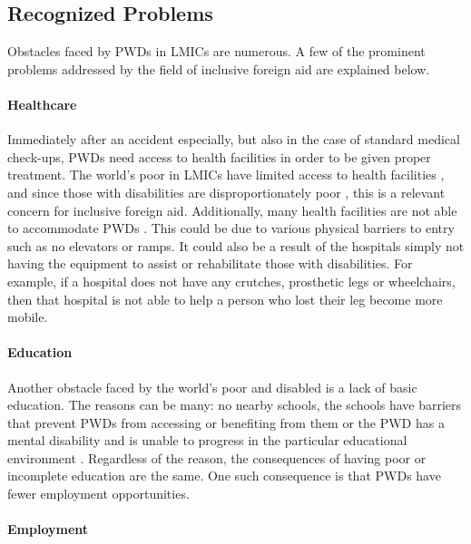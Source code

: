 \documentclass[a4paper]{article}
\begin{document}
\subsection{Recognized Problems}

Obstacles faced by PWDs in LMICs are numerous. A few of the prominent problems
addressed by the field of inclusive foreign aid are explained below.

\paragraph{Healthcare}

Immediately after an accident especially, but also in the case of standard
medical check-ups, PWDs need access to health facilities in order to be given
proper treatment. The world's poor in LMICs have limited access to health
facilities \citep{peters2008poverty}, and since those with disabilities are
disproportionately poor \citep{mitra2018disability}, this is a relevant
concern for inclusive foreign aid. Additionally, many health facilities are
not able to accommodate PWDs \citep{drainoni2006cross}. This could be due to
various physical barriers to entry such as no elevators or ramps. It could
also be a result of the hospitals simply not having the equipment to assist or
rehabilitate those with disabilities. For example, if a hospital does not have
any crutches, prosthetic legs or wheelchairs, then that hospital is not able
to help a person who lost their leg become more mobile.

\paragraph{Education}

Another obstacle faced by the world’s poor and disabled is a lack of basic
education. The reasons can be many: no nearby schools, the schools have
barriers that prevent PWDs from accessing or benefiting from them or the PWD
has a mental disability and is unable to progress in the particular
educational environment \citep{ingstad2011disability}. Regardless of the
reason, the consequences of having poor or incomplete education are the same.
One such consequence is that PWDs have fewer employment opportunities.

\paragraph{Employment}
\end{document}
